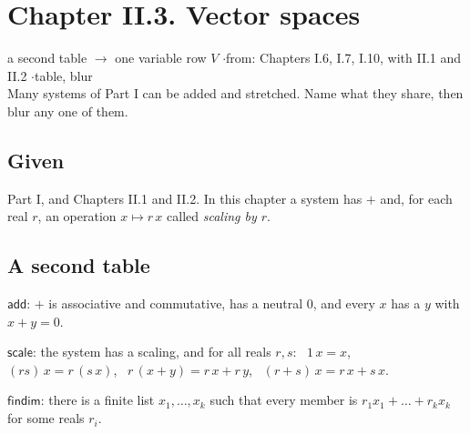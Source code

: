 \newpage

\section*{Chapter II.3. Vector spaces}
\begin{center}
{\normalsize a second table $\to$ one variable row $V$ \quad$\cdot$\quad from: Chapters I.6, I.7, I.10, with II.1 and II.2 \quad$\cdot$\quad table, blur}\\[4pt]
{\small Many systems of Part I can be added and stretched. Name what they share, then blur any one of them.}
\end{center}

\subsection*{Given}

Part I, and Chapters II.1 and II.2. In this chapter a system has $+$ and, for each real $r$, an operation $x \mapsto r\,x$ called \emph{scaling by $r$}.

\subsection*{A second table}

\begin{lines}
\item[\lab{D1}] $\mathsf{add}$: $+$ is associative and commutative, has a neutral $0$, and every $x$ has a $y$ with $x + y = 0$.
\item[\lab{D2}] $\mathsf{scale}$: the system has a scaling, and for all reals $r, s$: \ $1\,x = x$, \ $(rs)\,x = r\,(s\,x)$, \ $r\,(x + y) = r\,x + r\,y$, \ $(r + s)\,x = r\,x + s\,x$.
\item[\lab{D3}] $\mathsf{findim}$: there is a finite list $x_1, \dots, x_k$ such that every member is $r_1 x_1 + \dots + r_k x_k$ for some reals $r_i$.
\end{lines}

